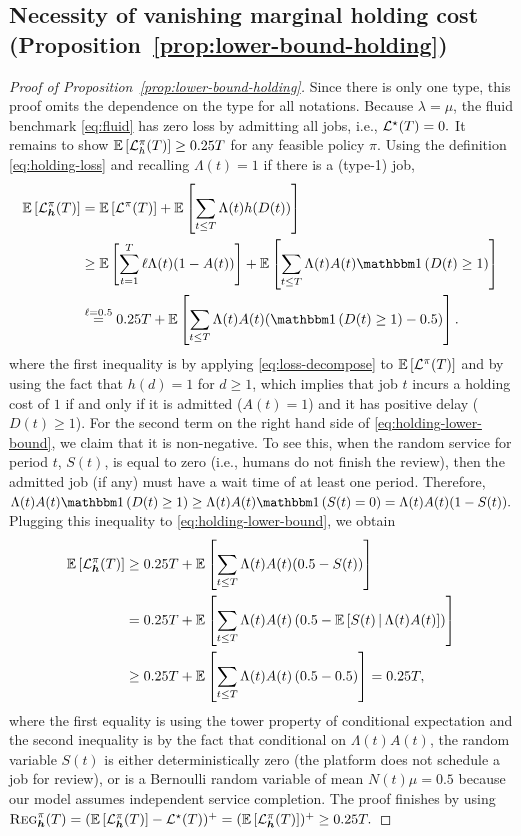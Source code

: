 \subsection{Necessity of vanishing marginal holding cost (Proposition~\ref{prop:lower-bound-holding})}\label{sec:pf-lowerbound-holding}
\begin{proof}[Proof of Proposition~\ref{prop:lower-bound-holding}]
Since there is only one type, this proof omits the dependence on the type for all notations. Because $\lambda = \mu$, the fluid benchmark \eqref{eq:fluid} has zero loss by admitting all jobs, i.e., $\mathcal{L}^\star(T) = 0.$ It remains to show $\mathbb E\left[\mathcal{L}_{h}^{\pi}(T)\right] \geq 0.25T$ for any feasible policy $\pi$. Using the definition \eqref{eq:holding-loss} and recalling $\Lambda(t) = 1$ if there is a (type-1) job,
\begin{align}
\expect{\set{L}_{\bolds{h}}^{\pi}(T)} &= \expect{\set{L}^{\pi}(T)}+\expect{\sum_{t \leq T} \Lambda(t) h(D(t))} \nonumber\\
&\geq  \expect{\sum_{t = 1}^T \ell\Lambda(t)(1 - A(t))} + \expect{\sum_{t \leq T} \Lambda(t) A(t)\indic{D(t) \geq 1}} \nonumber\\
&\overset{\ell=0.5}{=} 0.25 T + \expect{\sum_{t \leq T} \Lambda(t) A(t)(\indic{D(t) \geq 1} - 0.5)}. \label{eq:holding-lower-bound}
\end{align}
where the first inequality is by applying \eqref{eq:loss-decompose} to $\mathbb E\left[\mathcal{L}^{\pi}(T)\right]$ and by using the fact that $h(d) = 1$ for $d \geq 1$, which implies that job $t$ incurs a holding cost of $1$ if and only if it is admitted ($A(t)=1$) and it has positive delay ($D(t) \geq 1$). For the second term on the right hand side of \eqref{eq:holding-lower-bound}, we claim that it is non-negative. To see this, when the random service for period $t$, $S(t)$, is equal to zero (i.e., humans do not finish the review), then the admitted job (if any) must have a wait time of at least one period. Therefore, $\Lambda(t)A(t)\indic{D(t) \geq 1} \geq \Lambda(t)A(t)\indic{S(t)=0}=\Lambda(t)A(t)(1 - S(t)).$ Plugging this inequality to \eqref{eq:holding-lower-bound}, we obtain
\begin{align*}
\mathbb E\left[\mathcal{L}_{\boldsymbol{h}}^{\pi}(T)\right] &\geq 0.25T + \mathbb E\left[\sum_{t \leq T} \Lambda(t)A(t)(0.5-S(t))\right] \\
&= 0.25T + \mathbb E\left[\sum_{t \leq T} \Lambda(t)A(t)\left(0.5-\mathbb E\left[S(t) \,\middle\vert\, \Lambda(t)A(t)\right]\right)\right] \\
&\geq 0.25T + \mathbb E\left[\sum_{t \leq T} \Lambda(t)A(t)\left(0.5-0.5\right)\right] = 0.25T,
\end{align*}
where the first equality is using the tower property of conditional expectation and the second inequality is by the fact that conditional on $\Lambda(t)A(t)$, the random variable $S(t)$ is either deterministically zero (the platform does not schedule a job for review), or is a Bernoulli random variable of mean $N(t)\mu = 0.5$ because our model assumes independent service completion. The proof finishes by using $\textsc{Reg}_{\boldsymbol{h}}^{\pi}(T) = (\mathbb E\left[\mathcal{L}_{\boldsymbol{h}}^{\pi}(T)\right] - \mathcal{L}^\star(T))^+ = (\mathbb E\left[\mathcal{L}_{\boldsymbol{h}}^{\pi}(T)\right])^+ \geq 0.25T.$ 
\end{proof}